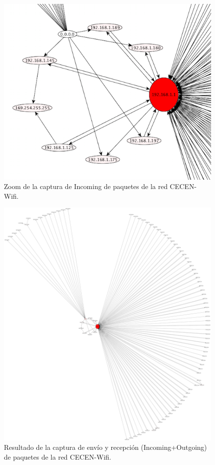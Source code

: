\documentclass[10pt, a4paper]{article}
\begin{document}
\begin{figure}[H] %
\begin{center}
\includegraphics[width=400pt]{../imgs/zoom-cecen-incoming.png}
\caption{Zoom de la captura de Incoming de paquetes de la red CECEN-Wifi.}
\end{center}
\end{figure}

\begin{figure}[H] %
\begin{center}
\includegraphics[width=400pt]{../imgs/cecen-entero.png}
\caption{Resultado de la captura de envío y recepción (Incoming+Outgoing) de paquetes de la red CECEN-Wifi.}
\end{center}
\end{figure}
\end{document}
